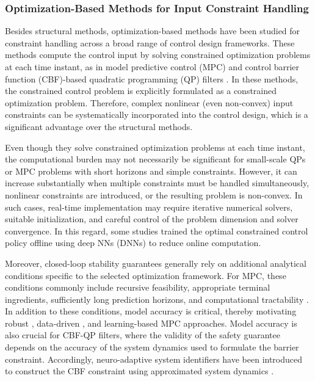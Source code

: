 \documentclass[letterpaper, journal]{IEEEtran}
\begin{document}


\subsubsection{Optimization-Based Methods for Input Constraint Handling}

Besides structural methods, optimization-based methods have been studied for constraint handling across a broad range of control design frameworks.
These methods compute the control input by solving constrained optimization problems at each time instant, as in model predictive control (MPC) \cite{Vahidi-Moghaddam:2025aa,Mallick:2025aa,Khodaverdian:2025aa,Greune:2011aa,Bemporad:1999aa,Berberich:2025aa,Draeger:1995aa} and control barrier function (CBF)-based quadratic programming (QP) filters \cite{Ames:2019aa,Ko:2025aa,Sweatland:2025aa}. 
In these methods, the constrained control problem is explicitly formulated as a constrained optimization problem.
Therefore, complex nonlinear (even non-convex) input constraints can be systematically incorporated into the control design, which is a significant advantage over the structural methods.

Even though they solve constrained optimization problems at each time instant, the computational burden may not necessarily be significant for small-scale QPs or MPC problems with short horizons and simple constraints.
However, it can increase substantially when multiple constraints must be handled simultaneously, nonlinear constraints are introduced, or the resulting problem is non-convex.
In such cases, real-time implementation may require iterative numerical solvers, suitable initialization, and careful control of the problem dimension and solver convergence.
In this regard, some studies \cite{Vahidi-Moghaddam:2025aa,Mallick:2025aa,Khodaverdian:2025aa} trained the optimal constrained control policy offline using deep NNs (DNNs) to reduce online computation.

Moreover, closed-loop stability guarantees generally rely on additional analytical conditions specific to the selected optimization framework.
For MPC, these conditions commonly include recursive feasibility, appropriate terminal ingredients, sufficiently long prediction horizons, and computational tractability \cite{Greune:2011aa}.
In addition to these conditions, model accuracy is critical, thereby motivating robust \cite{Bemporad:1999aa}, data-driven \cite{Berberich:2025aa}, and learning-based MPC \cite{Draeger:1995aa,Vahidi-Moghaddam:2025aa} approaches.
Model accuracy is also crucial for CBF-QP filters, where the validity of the safety guarantee depends on the accuracy of the system dynamics used to formulate the barrier constraint.
Accordingly, neuro-adaptive system identifiers have been introduced to construct the CBF constraint using approximated system dynamics \cite{Sweatland:2025aa}.
\end{document}
